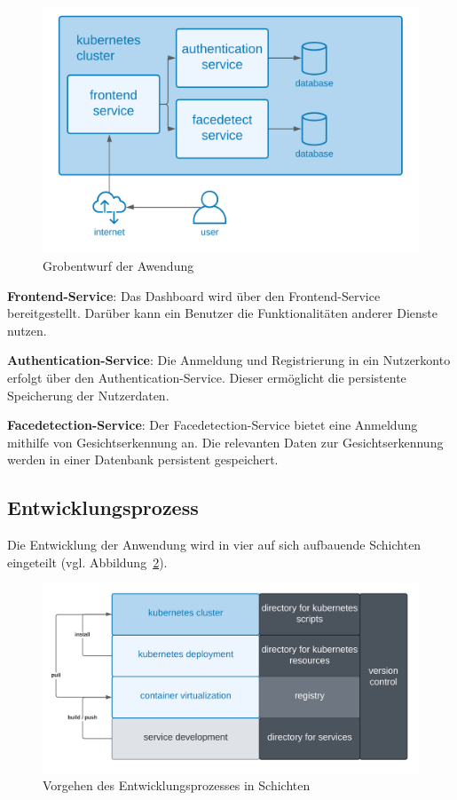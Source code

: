 \begin{figure}[!htb]
  \centering
  \includegraphics[width=0.8\columnwidth]{images/GrobentwurfAnwendung.png}
  \caption{Grobentwurf der Awendung}
  \label{fig:GrobentwurfAnwendung}
\end{figure}

\textbf{Frontend-Service}: Das Dashboard wird über den Frontend-Service bereitgestellt.
Darüber kann ein Benutzer die Funktionalitäten anderer Dienste nutzen.

\textbf{Authentication-Service}: Die Anmeldung und Registrierung in ein Nutzerkonto erfolgt über den Authentication-Service.
Dieser ermöglicht die persistente Speicherung der Nutzerdaten.

\textbf{Facedetection-Service}: Der Facedetection-Service bietet eine Anmeldung mithilfe von Gesichtserkennung an.
Die relevanten Daten zur Gesichtserkennung werden in einer Datenbank persistent gespeichert.

\subsection{Entwicklungsprozess}

Die Entwicklung der Anwendung wird in vier auf sich aufbauende Schichten eingeteilt (vgl. Abbildung~\ref{fig:Schichtenentwurf}).

\begin{figure}[!htb]
    \centering
    \includegraphics[width=1.0\columnwidth]{images/Schichtenentwurf.png}
    \caption{Vorgehen des Entwicklungsprozesses in Schichten}
    \label{fig:Schichtenentwurf}
  \end{figure}

